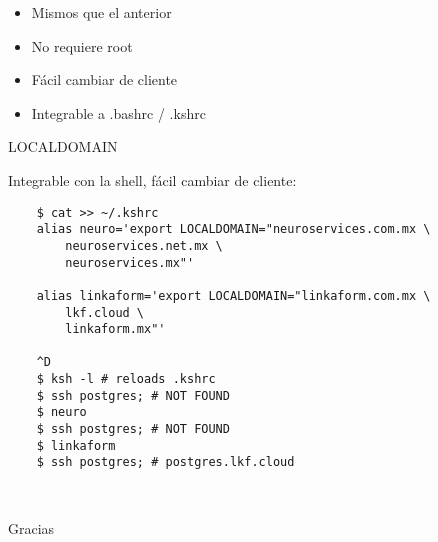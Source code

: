 \documentclass[11pt,spanish]{article}
\newcommand{\rowsp}[1][1em]{\vspace{#1}}
\newcommand{\hone}[1]{{\rowsp[0.3em]\noindent\Large #1 \rowsp[0.3em]}}
\newcommand{\myitm}[1]{\begin{itemize}#1\end{itemize}}
\newcommand{\pros}{\item[pros:]}
\begin{document}
\myitm{
	\pros Mismos que el anterior
	\pros No requiere root
	\pros Fácil cambiar de cliente
	\pros Integrable a .bashrc / .kshrc
}

\newpage %

\hone{LOCALDOMAIN}

Integrable con la shell, fácil cambiar de cliente:

\begin{lstlisting}
	$ cat >> ~/.kshrc
	alias neuro='export LOCALDOMAIN="neuroservices.com.mx \
		neuroservices.net.mx \
		neuroservices.mx"'

	alias linkaform='export LOCALDOMAIN="linkaform.com.mx \
		lkf.cloud \
		linkaform.mx"'

	^D
	$ ksh -l # reloads .kshrc
	$ ssh postgres; # NOT FOUND
	$ neuro
	$ ssh postgres; # NOT FOUND
	$ linkaform
	$ ssh postgres; # postgres.lkf.cloud
\end{lstlisting}

\newpage %
\ 
\begin{center}
\hone{Gracias}
\end{center}
\vspace{\stretch{1}}

\label{lastpage}
\end{document}
